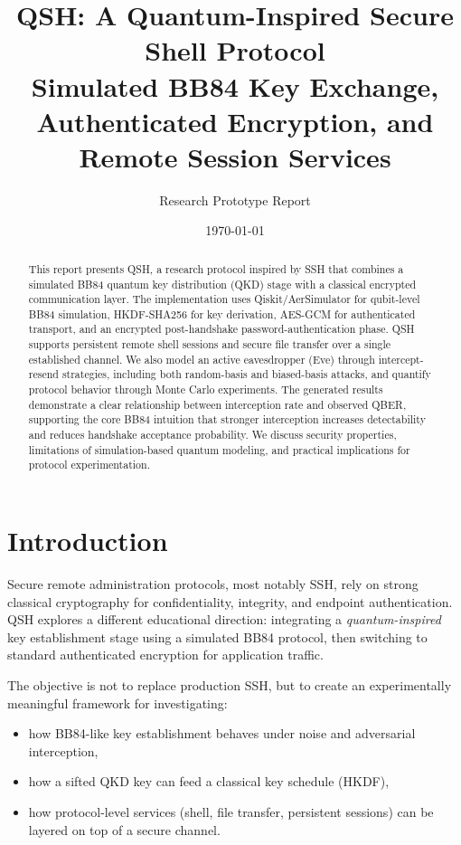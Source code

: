 \documentclass[11pt,a4paper]{article}
\title{\textbf{QSH: A Quantum-Inspired Secure Shell Protocol}\\
\large Simulated BB84 Key Exchange, Authenticated Encryption, and Remote Session Services}
\author{Research Prototype Report}
\date{\today}
\begin{document}
\maketitle
\begin{abstract}
This report presents QSH, a research protocol inspired by SSH that combines a simulated BB84 quantum key distribution (QKD) stage with a classical encrypted communication layer. The implementation uses Qiskit/AerSimulator for qubit-level BB84 simulation, HKDF-SHA256 for key derivation, AES-GCM for authenticated transport, and an encrypted post-handshake password-authentication phase. QSH supports persistent remote shell sessions and secure file transfer over a single established channel. We also model an active eavesdropper (Eve) through intercept-resend strategies, including both random-basis and biased-basis attacks, and quantify protocol behavior through Monte Carlo experiments. The generated results demonstrate a clear relationship between interception rate and observed QBER, supporting the core BB84 intuition that stronger interception increases detectability and reduces handshake acceptance probability. We discuss security properties, limitations of simulation-based quantum modeling, and practical implications for protocol experimentation.
\end{abstract}

\tableofcontents
\newpage

\section{Introduction}
Secure remote administration protocols, most notably SSH, rely on strong classical cryptography for confidentiality, integrity, and endpoint authentication. QSH explores a different educational direction: integrating a \emph{quantum-inspired} key establishment stage using a simulated BB84 protocol, then switching to standard authenticated encryption for application traffic.

The objective is not to replace production SSH, but to create an experimentally meaningful framework for investigating:
\begin{itemize}[leftmargin=1.5em]
  \item how BB84-like key establishment behaves under noise and adversarial interception,
  \item how a sifted QKD key can feed a classical key schedule (HKDF),
  \item how protocol-level services (shell, file transfer, persistent sessions) can be layered on top of a secure channel.
\end{itemize}
\end{document}

